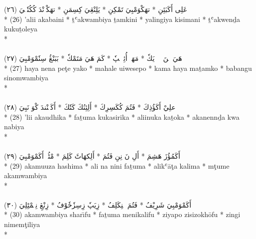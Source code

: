 \documentclass[a4paper, 12pt]{report}
\begin{document}
\begin{center}
\textarabic{(٢٦) \textcolor{mygreen}{عَلِى أَكَبَئِنِ  * تهَكْوَمْبِيَ تَمْكِنِ  * يَلِنْڠِيَ كِسِمَنِ  * تهَكْوٖنْدَ كُكُتٗلٖيَ }} \\* 
(26) 'alii akabaini  * ṯʿakwambiya ṯamkini  * yalingiya kisimani  * ṯʿakwenḏa kukuṯoleya  \\* 
 \\ 
\\[8mm] 

\textarabic{(٢٧) \textcolor{mygreen}{هَيَ نٖنَ پٖٹٖ يَكٗ  * مَهَلٖ أُئِوٖسٖپٗ  * كَمَ هَيَ مَتَمْكٗ  * بَبَنْڠُ سِنٗمْوَمْبِيَ }} \\* 
(27) haya nena peţe yako  * mahale uiwesepo  * kama haya maṯamko  * babangu sinomwambiya  \\* 
 \\ 
\\[8mm] 

\textarabic{(٢٨) \textcolor{mygreen}{علِيْ أَكَؤُذِكَ  * فَتُمَ كُكَسِرِكَ  * أَلِئِنُكَ كَتٗكَ  * أَكَنٖنْندَ كْوَ نَبِيَ }} \\* 
(28) 'lii akaudhika  * faṯuma kukasirika  * aliinuka kaṯoka  * akanennḏa kwa nabiya  \\* 
 \\ 
\\[8mm] 

\textarabic{(٢٩) \textcolor{mygreen}{أَكَمُؤُزَ هَشِمَ  * أَلِ نَ نِنِ فَتُمَ  * أَلِكهَاٹَ كَلِمَ  * مْٹُمٖ أَكَمْوَمْبِيَ }} \\* 
(29) akamuuza hashima  * ali na nini faṯuma  * alikʿāţa kalima  * mţume akamwambiya  \\* 
 \\ 
\\[8mm] 

\textarabic{(٣٠) \textcolor{mygreen}{أَكَمْوَمْبِيَ شَرِيْفُ  * فَتُمَ مٖنِكَلِفُ  * زِيَپٗ زِسِزٗخٗوْفُ  * زِنْڠِ نِمٖمْٹِلِيَ }} \\* 
(30) akamwambiya sharı̄fu  * faṯuma menikalifu  * ziyapo zisizokhōfu  * zingi nimemţiliya  \\* 
 \\ 
\\[8mm] 


\end{center}
\end{document}
